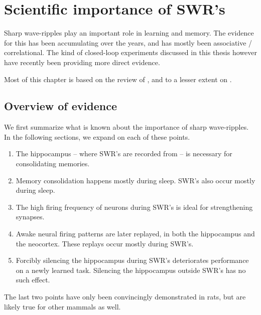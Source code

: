 \chapter{Scientific importance of SWR's}
\label{ch:science}

Sharp wave-ripples play an important role in learning and memory.\footnotemark{} The evidence for this has been accumulating over the years, and has mostly been associative / correlational. The kind of closed-loop experiments discussed in this thesis however have recently been providing more direct evidence.


Most of this chapter is based on the review of \citeauthor{Girardeau2011} \cite{Girardeau2011}, and to a lesser extent on \cite{Buzsaki1986,Buzsaki2015,Olafsdottir2018,Purves2017}.




\section{Overview of evidence}

We first summarize what is known about the importance of sharp wave-ripples. In the following sections, we expand on each of these points.
%
\begin{enumerate}
\item The hippocampus -- where SWR's are recorded from -- is necessary for consolidating memories.
\item Memory consolidation happens mostly during sleep. SWR's also occur mostly during sleep.
\item The high firing frequency of neurons during SWR's is ideal for strengthening synapses.
\item Awake neural firing patterns are later replayed, in both the hippocampus and the neocortex. These replays occur mostly during SWR's.
\item Forcibly silencing the hippocampus during SWR's deteriorates performance on a newly learned task. Silencing the hippocampus outside SWR's has no such effect.
\end{enumerate}
%
The last two points have only been convincingly demonstrated in rats, but are likely true for other mammals as well.




